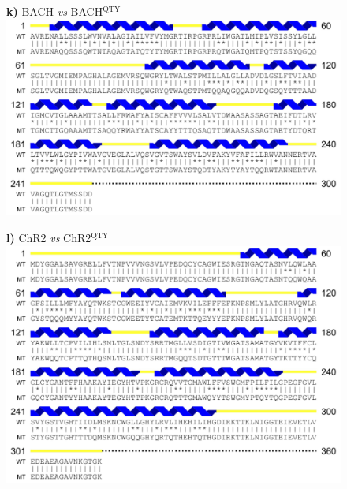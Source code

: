 \documentclass[fleqn,12pt]{supp}
\begin{document}
\newpage
\begin{figure}[H]
    \textbf{k)} BACH \textit{vs} BACH$^{\textrm{QTY}}$ \\
    \includegraphics[width=\linewidth]{SuppFigures/bach.jpg}
\end{figure}

\newpage
\begin{figure}[H]
    \textbf{l)} ChR2 \textit{vs} ChR2$^{\textrm{QTY}}$ \\
    \includegraphics[width=\linewidth]{SuppFigures/chr2.jpg}
\end{figure}
\end{document}
